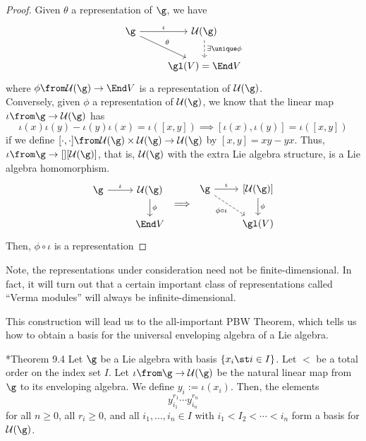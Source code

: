 \documentclass[11pt,leqno,oneside]{amsart}
\numberwithin{thm}{section}
\newcommand{\U}{\mathcal{U}}
\begin{document}
\begin{proof}
  Given \(\theta\) a representation of \(\g\), we have \[
    \begin{tikzcd}
      \g \ar[rd, "\theta"]\ar[r, "\iota"] & \U(\g) \ar[d, dashed,
      "\exists \unique \phi"] \\ 
      & \gl(V) = \End V
    \end{tikzcd}
  \]
  where \(\phi \from \U(\g) \to \End V\) is a representation of
  \(\U(\g)\). \\

  Conversely, given \(\phi\) a representation of \(\U(\g)\), we know
  that the linear map \(\iota \from \g \to \U(\g)\) has \[
    \iota(x)\iota(y)-\iota(y)\iota(x) = \iota([x,y]) \implies
    [\iota(x),\iota(y)] = \iota([x,y])
  \]
  if we define \([\cdot,\cdot] \from \U(\g)\times \U(\g) \to \U(\g)\)
  by \([x,y] = xy-yx\). Thus, \(\iota \from \g \to[] [\U(\g)]\), that
  is, \(\U(\g)\) with the extra Lie algebra structure, is a Lie
  algebra homomorphism. \[
    \begin{tikzcd}
      \g \ar[r, "\iota"] & \U(\g) \ar[d, "\phi"] \\
      & \End V
    \end{tikzcd} \implies
    \begin{tikzcd}
      \g \ar[r, "\iota"] \ar[rd, dashed, swap, "\phi \circ \iota"] &
      {[}\U(\g){]} \ar[d, "\phi"] \\ 
      & \gl(V)
    \end{tikzcd}
  \]
  Then, \(\phi \circ \iota\) is a representation 
\end{proof}
\begin{rmk}
  Note, the representations under consideration need not be
  finite-dimensional. In fact, it will turn out that a certain
  important class of representations called ``Verma modules'' will
  always be infinite-dimensional.
\end{rmk}
This construction will lead us to the all-important PBW Theorem, which
tells us how to obtain a basis for the universal enveloping algebra of
a Lie algebra.
\begin{thm}
  \cite{carter}*{Theorem 9.4} Let \(\g\) be a Lie algebra with basis
  \(\{x_i \st i \in I\}\). Let \(<\) be a total order on the index set
  \(I\). Let \(\iota \from \g \to \U(\g)\) be the natural linear map
  from \(\g\) to its enveloping algebra. We define \(y_i :=
  \iota(x_i)\). Then, the elements \[
    y_{i_1}^{r_1} \cdots y_{i_n}^{r_n}
  \]
  for all \(n \geq 0\), all \(r_i \geq 0\), and all \(i_1, \ldots, i_n
  \in I\) with \(i_1 < I_2 < \cdots < i_n\) form a basis for \(\U(\g)\).
\end{thm}
\end{document}
